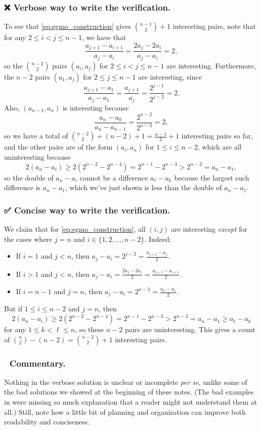 \documentclass[11pt]{scrartcl}
\begin{document}
\subsubsection*{❌ Verbose way to write the verification.}
To see that \eqref{eq:egmo_construction} gives $\binom{n-1}{2}+1$ interesting pairs,
note that for any $2\leq i < j \leq n-1$, we have that
\[ \frac{a_{j+1} - a_{i+1}}{a_j - a_i} = \frac{2a_j-2a_i}{a_j-a_i} = 2, \]
so the $\binom{n-2}{2}$ pairs $(a_i, a_j)$ for $2\leq i<j \leq n-1$ are interesting.
Furthermore, the $n-2$ pairs $(a_1, a_j)$ for $2\leq j\leq n-1$ are interesting, since
\[ \frac{a_{j+1} - a_1}{a_j-a_1} = \frac{a_{j+1}}{a_j} = \frac{2^{j-1}}{2^{j-2}} = 2. \]
Also, $(a_{n-1}, a_n)$ is interesting because
\[ \frac{a_n-a_0}{a_n - a_{n-1}} = \frac{2^{n-2}}{2^{n-3}} = 2, \]
so we have a total of $\binom{n-2}{2} + (n-2) + 1 = \frac{n-1}{2} + 1$ interesting pairs so far,
and the other pairs are of the form $(a_i, a_n)$ for $1\leq i\leq n-2$,
which are all uninteresting because
\[ 2(a_n - a_i) \geq  2(2^{n-2} - 2^{n-4}) = 2^{n-1} - 2^{n-3} > 2^{n-2} = a_n - a_1, \]
so the double of $a_n-a_i$ cannot be a difference $a_\ell-a_k$
because the largest such difference is $a_n-a_1$, which we've just shown is
less than the double of $a_n-a_1$.

\subsubsection*{✅ Concise way to write the verification.}
We claim that for \eqref{eq:egmo_construction},
all $(i,j)$ are interesting \emph{except} for the cases where $j = n$ and $i \in \{1,2,\dots,n-2\}$.
Indeed:
\begin{itemize}
  \item If $i=1$ and $j<n$, then $a_j - a_i = 2^{j-2} = \frac{a_{j+1}-a_j}{2}$.
  \item If $i>1$ and $j<n$, then $a_j - a_i = \frac{2a_j-2a_i}{2} = \frac{a_{j+1}-a_{i+1}}{2}$.
  \item If $i=n-1$ and $j=n$, then $a_j - a_i = 2^{n-3} = \frac{a_n - a_1}{2}$.
\end{itemize}
But if $1 \le i \le n-2$ and $j=n$, then
\[ 2(a_n - a_i) \geq  2(2^{n-2} - 2^{n-4}) = 2^{n-1} - 2^{n-3} > 2^{n-2} = a_n - a_1
  \ge a_\ell - a_k \]
for any $1 \le k < \ell \le n$, so these $n-2$ pairs are uninteresting.
This gives a count of $\binom{n}{2} - (n-2) = \binom{n-2}{2}+1$ interesting pairs.

\subsubsection*{💬 Commentary.}
Nothing in the verbose solution is unclear or incomplete \emph{per se},
unlike some of the bad solutions we showed at the beginning of these notes.
(The bad examples in  were missing so much explanation
that a reader might not understand them at all.)
Still, note how a little bit of planning and organization
can improve both readability and conciseness.
\end{document}
